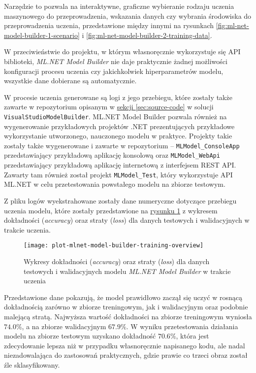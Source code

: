 Narzędzie to pozwala na interaktywne, graficzne wybieranie rodzaju uczenia maszynowego do przeprowadzenia, wskazania danych czy wybrania środowiska do przeprowadzenia uczenia, przedstawione między innymi na rysunkach \ref{fig:ml-net-model-builder-1-scenario} i \ref{fig:ml-net-model-builder-2-training-data}.

W przeciwieństwie do projektu, w którym własnoręcznie wykorzystuje się API biblioteki, \emph{ML.NET Model Builder} nie daje praktycznie żadnej możliwości konfiguracji procesu uczenia czy jakichkolwiek hiperparametrów modelu, wszystkie dane dobierane są automatycznie.

W procesie uczenia generowane są logi z jego przebiegu, które zostały także zawarte w repozytorium opisanym w \hyperref[sec:source-code]{sekcji \ref*{sec:source-code}} w solucji \lstinline{VisualStudioModelBuilder}.
ML.NET Model Builder pozwala również na wygenerowanie przykładowych projektów .NET prezentujących przykładowe wykorzystanie utworzonego, nauczonego modelu w praktyce.
Projekty takie zostały także wygenerowane i zawarte w repozytorium -- \lstinline{MLModel_ConsoleApp} przedstawiający przykładową aplikację konsolową oraz \lstinline{MLModel_WebApi} przedstawiający przykładową aplikację internetową z interfejsem REST API.
Zawarty tam również został projekt \lstinline{MLModel_Test}, który wykorzystuje API ML.NET w celu przetestowania powstałego modelu na zbiorze testowym.

Z pliku logów wyekstrahowane zostały dane numeryczne dotyczące przebiegu uczenia modelu, które zostały przedstawione na \hyperref[fig:plot-mlnet-model-builder-training-overview]{rysunku \ref*{fig:plot-mlnet-model-builder-training-overview}} z wykresem dokładności (\emph{accuracy}) oraz straty (\emph{loss}) dla danych testowych i walidacyjnych w trakcie uczenia.

\begin{figure}[ht]
  \texttt{[image: plot-mlnet-model-builder-training-overview]}
  \caption[Wykresy statystyk modelu ML.NET Model Builder w trakcie uczenia]{Wykresy dokładności (\emph{accuracy}) oraz straty (\emph{loss}) dla danych testowych i walidacyjnych modelu \emph{ML.NET Model Builder} w trakcie uczenia}
  \label{fig:plot-mlnet-model-builder-training-overview}
\end{figure}

Przedstawione dane pokazują, że model prawidłowo zaczął się uczyć w rosnącą dokładnością zarówno w zbiorze treningowym, jak i walidacyjnym oraz podobnie malejącą stratą.
Najwyższa wartość dokładności na zbiorze treningowym wyniosła $74.0\%$, a na zbiorze walidacyjnym $67.9\%$.
W wyniku przetestowania działania modelu na zbiorze testowym uzyskano dokładność $70.6\%$, która jest zdecydowanie lepsza niż w przypadku własnoręcznie napisanego kodu, ale nadal niezadowalająca do zastosowań praktycznych, gdzie prawie co trzeci obraz został źle sklasyfikowany.


